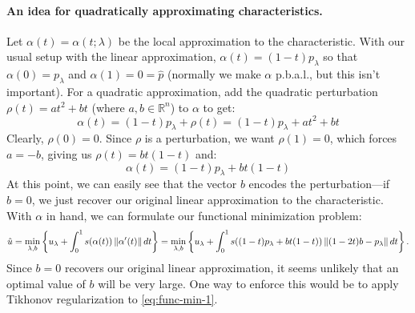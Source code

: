 \documentclass[eikonal.tex]{subfiles}
\begin{document}
\paragraph{An idea for quadratically approximating characteristics.}
Let $\alpha(t) = \alpha(t; \lambda)$ be the local approximation to the
characteristic. With our usual setup with the linear approximation,
$\alpha(t) = (1 - t) p_\lambda$ so that $\alpha(0) = p_\lambda$ and
$\alpha(1) = 0 = \hat{p}$ (normally we make $\alpha$ p.b.a.l., but
this isn't important). For a quadratic approximation, add the
quadratic perturbation $\rho(t) = at^2 + bt$ (where
$a, b \in \mathbb{R}^n$) to $\alpha$ to get:
\begin{equation}
  \alpha(t) = (1 - t)p_\lambda + \rho(t) = (1 - t)p_\lambda + at^2 + bt
\end{equation}
Clearly, $\rho(0) = 0$. Since $\rho$ is a perturbation, we want
$\rho(1) = 0$, which forces $a = -b$, giving us $\rho(t) = bt(1-t)$
and:
\begin{equation}
  \alpha(t) = (1 - t)p_\lambda + bt(1 - t)
\end{equation}
At this point, we can easily see that the vector $b$ encodes the
perturbation---if $b = 0$, we just recover our original linear
approximation to the characteristic. With $\alpha$ in hand, we can
formulate our functional minimization problem:
\begin{equation}\label{eq:func-min-1}
  \hat{u} = \min_{\lambda, b} \left\{u_\lambda + \int_0^1 s(\alpha(t)) \left\|\alpha'(t)\right\| dt\right\} = \min_{\lambda, b} \left\{u_\lambda + \int_0^1 s((1 - t)p_\lambda + bt(1 - t)) \left\|(1 - 2t)b - p_\lambda\right\| dt\right\}.
\end{equation}
Since $b = 0$ recovers our original linear approximation, it seems
unlikely that an optimal value of $b$ will be very large. One way to
enforce this would be to apply Tikhonov regularization to
\cref{eq:func-min-1}.
\end{document}
